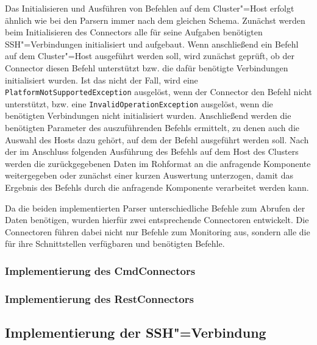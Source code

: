 Das Initialisieren und Ausführen von Befehlen auf dem Cluster"=Host erfolgt ähnlich wie bei den Parsern immer nach dem gleichen Schema.
Zunächst werden beim Initialisieren des Connectors alle für seine Aufgaben benötigten SSH"=Verbindungen initialisiert und aufgebaut.
Wenn anschließend ein Befehl auf dem Cluster"=Host ausgeführt werden soll, wird zunächst geprüft, ob der Connector diesen Befehl unterstützt bzw. die dafür benötigte Verbindungen initialisiert wurden.
Ist das nicht der Fall, wird eine \texttt{PlatformNotSupportedException} ausgelöst, wenn der Connector den Befehl nicht unterstützt, bzw. eine  \texttt{InvalidOperationException} ausgelöst, wenn die benötigten Verbindungen nicht initialisiert wurden.
Anschließend werden die benötigten Parameter des auszuführenden Befehls ermittelt, zu denen auch die Auswahl des Hosts dazu gehört, auf dem der Befehl ausgeführt werden soll.
Nach der im Anschluss folgenden Ausführung des Befehls auf dem Host des Clusters werden die zurückgegebenen Daten im Rohformat an die anfragende Komponente weitergegeben oder zunächst einer kurzen Auswertung unterzogen, damit das Ergebnis des Befehls durch die anfragende Komponente verarbeitet werden kann.

Da die beiden implementierten Parser unterschiedliche Befehle zum Abrufen der Daten benötigen, wurden hierfür zwei entsprechende Connectoren entwickelt.
Die Connectoren führen dabei nicht nur Befehle zum Monitoring aus, sondern alle die für ihre Schnittstellen verfügbaren und benötigten Befehle.

\subsubsection{Implementierung des CmdConnectors}
\label{subsubsec:implCmdConnector}

\subsubsection{Implementierung des RestConnectors}
\label{subsubsec:implRestConnector}

\subsection{Implementierung der SSH"=Verbindung}
\label{subsec:sshConnection}



